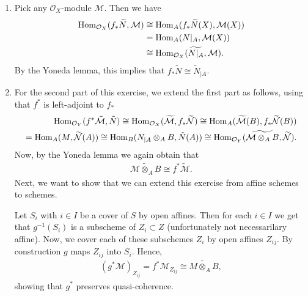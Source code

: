 \newcommand{\sheet}{7}




\maketitle{}

\begin{exercise}{1}
    \begin{enumerate}
        \item
        Pick any $\mathcal{O}_X$-module $\mathcal{M}$. Then we have
        \begin{align*}
            \operatorname{Hom}_{\mathcal{O}_X} (f_* \widetilde{N}, \mathcal{M}) &\cong
            \operatorname{Hom}_A(f_* \widetilde{N}(X), \mathcal{M}(X)) \\
            &= \operatorname{Hom}_A(N|_A, \mathcal{M}(X)) \\
            &\cong \operatorname{Hom}_{\mathcal{O}_X}(\widetilde{N|_A}, \mathcal{M}).
        \end{align*}
        By the Yoneda lemma, this implies that $f_*\widetilde{N}\cong
    \tilde{N}_{|A}$. 
    \item For the second part of this exercise, we extend the
        first part as follows, using that $f^*$ is left-adjoint to $f_*$
        \begin{align*}
            \operatorname{Hom}_{\mathcal{O}_Y}(f^*\tilde{\mathcal{M}},\tilde{N})
            \cong \operatorname{Hom}_{\mathcal{O}_X}(\widetilde{\mathcal{M}},f_*\widetilde{\mathcal{N}})
            \cong \operatorname{Hom}_A (\widetilde{\mathcal{M}}(B),f_*\widetilde{\mathcal{N}}(B))\\
            = \operatorname{Hom}_A(M,\widetilde{\mathcal{N}}(A))
            \cong \operatorname{Hom}_B(N_{|A}\otimes_A B, \tilde{N}(A))
            \cong \operatorname{Hom}_{\mathcal{O}_Y}(\widetilde{\mathcal{M}\otimes_A B}, \widetilde{\mathcal{N}}).
        \end{align*} 
        Now, by the Yoneda lemma we again obtain that 
        \begin{align*}
            \widetilde{\mathcal{M}\otimes_A B} 
            \cong f^*\tilde{\mathcal{M}}.
        \end{align*}
        Next, we want to show that we can extend this exercise from affine schemes to schemes.
        
        Let $S_i$ with $i\in I$ be a cover of $S$ by open affines. Then for each $i\in I$ we get that
        $g^{-1}(S_i)$ is a subscheme of $Z_i\subset Z$ (unfortunately not necessarilary affine). Now, we cover
        each of these subschemes $Z_i$ by open affines $Z_{ij}$. By construction $g$ maps $Z_{ij}$ into $S_i$.
        Hence, 
        \begin{align*}
            (g^*\mathcal{M})_{Z_{ij}}=f^*\mathcal{M}_{Z_{ij}}\cong \widetilde{M\otimes_A B},
        \end{align*}
        showing that $g^*$ preserves quasi-coherence.
    \end{enumerate}
\end{exercise}

